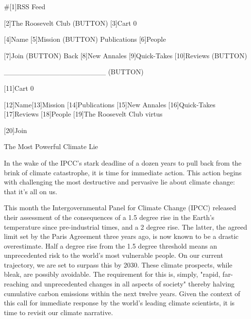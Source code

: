    #[1]RSS Feed

   [2]The Roosevelt Club
   (BUTTON)
   [3]Cart 0

   [4]Name [5]Mission (BUTTON) Publications [6]People

   [7]Join
   (BUTTON) Back [8]New Annales [9]Quick-Takes [10]Reviews
   (BUTTON)

   ____________________ (BUTTON)

   [11]Cart 0

   [12]Name[13]Mission [14]Publications [15]New Annales [16]Quick-Takes
   [17]Reviews [18]People
   [19]The Roosevelt Club
   virtus

   [20]Join

The Most Powerful Climate Lie

In the wake of the IPCC's stark deadline of a dozen years to pull back from
the brink of climate catastrophe, it is time for immediate action. This
action begins with challenging the most destructive and pervasive lie about
climate change: that it's all on us.

   This month the Intergovernmental Panel for Climate Change (IPCC)
   released their assessment of the consequences of a 1.5 degree rise in
   the Earth's temperature since pre-industrial times, and a 2 degree
   rise. The latter, the agreed limit set by the Paris Agreement three
   years ago, is now known to be a drastic overestimate. Half a degree
   rise from the 1.5 degree threshold means an unprecedented risk to the
   world's most vulnerable people. On our current trajectory, we are set
   to surpass this by 2030. These climate prospects, while bleak, are
   possibly avoidable. The requirement for this is, simply, "rapid,
   far-reaching and unprecedented changes in all aspects of society"
   thereby halving cumulative carbon emissions within the next twelve
   years. Given the context of this call for immediate response by the
   world's leading climate scientists, it is time to revisit our climate
   narrative.

